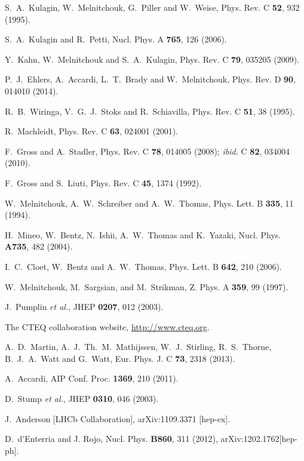 \documentclass[aps,prd,amsmath,preprint]{revtex4}
\begin{document}
\begin{thebibliography}{99}
S.~A.~Kulagin, W.~Melnitchouk, G.~Piller and W.~Weise,
Phys. Rev. C {\bf 52}, 932 (1995).

S.~A.~Kulagin and R.~Petti,
Nucl. Phys. A {\bf 765}, 126 (2006).

Y.~Kahn, W.~Melnitchouk and S.~A.~Kulagin,
Phys. Rev. C {\bf 79}, 035205 (2009).

P.~J.~Ehlers, A.~Accardi, L.~T.~Brady and W.~Melnitchouk,
Phys. Rev. D {\bf 90}, 014010 (2014).

R.~B.~Wiringa, V.~G.~J.~Stoks and R.~Schiavilla,
Phys. Rev. C {\bf 51}, 38 (1995).

R.~Machleidt,
Phys. Rev. C {\bf 63}, 024001 (2001).

F.~Gross and A.~Stadler,
Phys. Rev. C {\bf 78}, 014005 (2008);
{\it ibid.} C {\bf 82}, 034004 (2010).

F.~Gross and S.~Liuti,
Phys. Rev. C {\bf 45}, 1374 (1992).

W.~Melnitchouk, A.~W.~Schreiber and A.~W.~Thomas,
Phys. Lett. B {\bf 335}, 11 (1994).

H.~Mineo, W.~Bentz, N.~Ishii, A.~W.~Thomas and K.~Yazaki,
Nucl. Phys. {\bf A735}, 482 (2004).

I.~C.~Cloet, W.~Bentz and A.~W.~Thomas,
Phys. Lett. B {\bf 642}, 210 (2006).

W.~Melnitchouk, M.~Sargsian, and M.~Strikman,
Z. Phys. A {\bf 359}, 99 (1997).

J.~Pumplin {\it et al.},
JHEP {\bf 0207}, 012 (2003).
 

The CTEQ collaboration website,
\url{http://www.cteq.org}.

A.~D.~Martin, A.~J.~Th.~M.~Mathijssen, W.~J.~Stirling, R.~S.~Thorne, 
B.~J.~A.~Watt and G.~Watt,
Eur. Phys. J. C {\bf 73}, 2318 (2013).

A.~Accardi,
AIP Conf. Proc. {\bf 1369}, 210 (2011).

D.~Stump {\it et al.},
JHEP {\bf 0310}, 046 (2003).

J.~Anderson [LHCb Collaboration],
arXiv:1109.3371 [hep-ex].

D.~d'Enterria and J. Rojo, Nucl. Phys. {\bf B860}, 311 (2012), 
arXiv:1202.1762[hep-ph].


\end{thebibliography}
\end{document}
